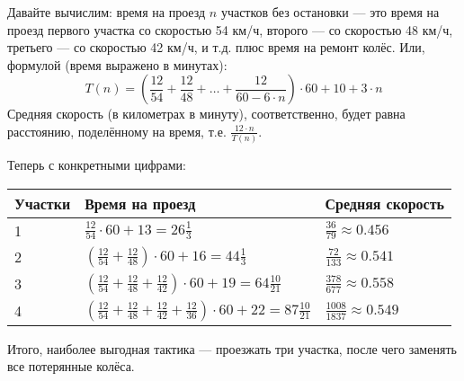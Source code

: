 \begin{itemize}
\begin{center}\end{center}


\itC Давайте вычислим: время на проезд $n$ участков без остановки --- 
это время на проезд первого участка 
со скоростью 54 км/ч, второго --- со скоростью 48 км/ч, третьего --- со скоростью 42 км/ч, и т.д.
плюс время на ремонт колёс. Или, формулой (время выражено в минутах):
 $$T(n) = \left(\frac{12}{54} + \frac{12}{48} + \dots + \frac{12}{60 - 6 \cdot n}\right) \cdot 60 + 10 + 3 \cdot n$$
Средняя скорость (в километрах в минуту), соответственно, будет равна расстоянию, поделённому на время, т.е.
$\frac{12 \cdot n}{T(n)}$.

Теперь с конкретными цифрами:

\begin{tabular}{lll}
Участки & Время на проезд & Средняя скорость \\
\hline
1	& $\frac{12}{54} \cdot 60 + 13 = 26\frac{1}{3}$ & $\frac{36}{79} \approx 0.456$ \\
2	& $\left(\frac{12}{54} + \frac{12}{48}\right) \cdot 60 + 16 = 44\frac{1}{3}$ & $\frac{72}{133} \approx 0.541$ \\
3	& $\left(\frac{12}{54} + \frac{12}{48} + \frac{12}{42}\right) \cdot 60 + 19 = 64\frac{10}{21}$ & $\frac{378}{677} \approx 0.558$ \\
4	& $\left(\frac{12}{54} + \frac{12}{48} + \frac{12}{42} + \frac{12}{36}\right) \cdot 60 + 22 = 87\frac{10}{21}$ & $\frac{1008}{1837} \approx 0.549$
\end{tabular}

Итого, наиболее выгодная тактика --- проезжать три участка, после чего заменять все потерянные колёса.
\end{itemize}